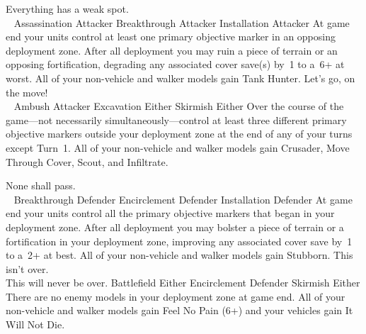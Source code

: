 \noindent%
%
{Everything has a weak spot.\\~}%
{Assassination}%
{Attacker}%
{Breakthrough}%
{Attacker}%
{Installation}%
{Attacker}%
{At game end your units control at least one primary objective marker
  in an opposing deployment zone.}%
{After all deployment you may ruin a piece of terrain or an opposing
  fortification, degrading any associated cover save(s) by~1 to a~6+
  at worst.  All of your non-vehicle and walker models gain Tank
  Hunter.}
\hfill
%
{Let's go, on the move!\\~}%
{Ambush}%
{Attacker}%
{Excavation}%
{Either}%
{Skirmish}%
{Either}%
{Over the course of the game---not necessarily
  simultaneously---control at least three different primary objective
  markers outside your deployment zone at the end of any of your turns
  except Turn~1.}%
%
{All of your non-vehicle and walker models gain Crusader, Move Through
  Cover, Scout, and Infiltrate.}

\vfill


\noindent%
%
{None shall pass.\\~}%
{Breakthrough}%
{Defender}%
{Encirclement}%
{Defender}%
{Installation}%
{Defender}%
{At game end your units control all the primary objective markers that
  began in your deployment zone.}%
{After all deployment you may bolster a piece of terrain or a
  fortification in your deployment zone, improving any associated
  cover save by~1 to a~2+ at best.  All of your non-vehicle and walker
  models gain Stubborn.}
\hfill
%
{This isn't over.\\This will never be over.}%
{Battlefield}%
{Either}%
{Encirclement}%
{Defender}%
{Skirmish}%
{Either}%
{There are no enemy models in your deployment zone at
  game end.}%
{All of your non-vehicle and walker models gain Feel No Pain (6+) and
  your vehicles gain It Will Not Die.}


\clearpage
\restorebackground
